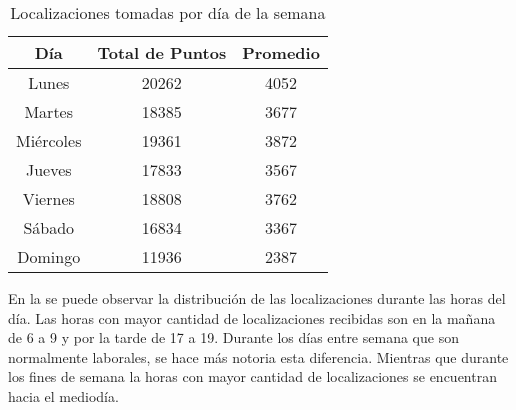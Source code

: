 \begin{table}[h]
	\centering
	\begin{tabular}{ccc}
        \toprule
    	Día  & Total de Puntos & Promedio\\
    	\midrule
    	Lunes & 20262 & 4052 \\
    	Martes & 18385 & 3677 \\
    	Miércoles & 19361  & 3872 \\ 
    	Jueves & 17833 & 3567 \\
    	Viernes & 18808 & 3762 \\
    	Sábado & 16834 & 3367 \\
    	Domingo & 11936 & 2387 \\
    	\bottomrule
	\end{tabular}
	\caption{Localizaciones tomadas por día de la semana} 
	\label{table:localizaciones_por_dia}
\end{table}

En la  se puede observar la distribución de las localizaciones durante las horas del día. Las horas con mayor cantidad de localizaciones recibidas son en la mañana de 6 a 9 y por la tarde de 17 a 19. Durante los días entre semana que son normalmente laborales, se hace más notoria esta diferencia. Mientras que durante los fines de semana la horas con mayor cantidad de localizaciones se encuentran hacia el mediodía.

